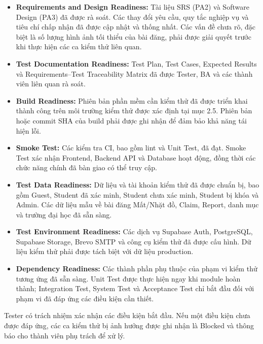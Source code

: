 \begin{itemize}
    \item \textbf{Requirements and Design Readiness:}
    Tài liệu SRS (PA2) và Software Design (PA3) 
    đã được rà soát. Các thay đổi yêu cầu, quy tắc 
    nghiệp vụ và tiêu chí chấp nhận đã được cập nhật 
    và thống nhất. Các vấn đề chưa rõ, đặc biệt là 
    số lượng hình ảnh tối thiểu của bài đăng, 
    phải được giải quyết trước khi thực hiện 
    các ca kiểm thử liên quan.

    \item \textbf{Test Documentation Readiness:}
    Test Plan, Test Cases, Expected Results và 
    Requirements--Test Traceability Matrix đã được 
    Tester, BA và các thành viên liên quan rà soát.

    \item \textbf{Build Readiness:}
    Phiên bản phần mềm cần kiểm thử đã được triển khai 
    thành công trên môi trường kiểm thử được xác định 
    tại mục 2.5. Phiên bản hoặc commit SHA của build 
    phải được ghi nhận để đảm bảo khả năng tái hiện lỗi.

    \item \textbf{Smoke Test:}
    Các kiểm tra CI, bao gồm lint và Unit Test, 
    đã đạt. Smoke Test xác nhận Frontend, Backend API 
    và Database hoạt động, đồng thời các chức năng 
    chính đã bàn giao có thể truy cập.

    \item \textbf{Test Data Readiness:}
    Dữ liệu và tài khoản kiểm thử đã được chuẩn bị, 
    bao gồm Guest, Student đã xác minh, Student chưa 
    xác minh, Student bị khóa và Admin. Các dữ liệu 
    mẫu về bài đăng Mất/Nhặt đồ, Claim, Report, 
    danh mục và trường đại học đã sẵn sàng.

    \item \textbf{Test Environment Readiness:}
    Các dịch vụ Supabase Auth, PostgreSQL, 
    Supabase Storage, Brevo SMTP và công cụ kiểm thử 
    đã được cấu hình. Dữ liệu kiểm thử phải được 
    tách biệt với dữ liệu production.

    \item \textbf{Dependency Readiness:}
    Các thành phần phụ thuộc của phạm vi kiểm thử 
    tương ứng đã sẵn sàng. Unit Test được thực hiện 
    ngay khi module hoàn thành; Integration Test, 
    System Test và Acceptance Test chỉ bắt đầu 
    đối với phạm vi đã đáp ứng các điều kiện 
    cần thiết.
\end{itemize}

Tester có trách nhiệm xác nhận các điều kiện bắt đầu. 
Nếu một điều kiện chưa được đáp ứng, các ca kiểm thử 
bị ảnh hưởng được ghi nhận là Blocked và thông báo 
cho thành viên phụ trách để xử lý.


